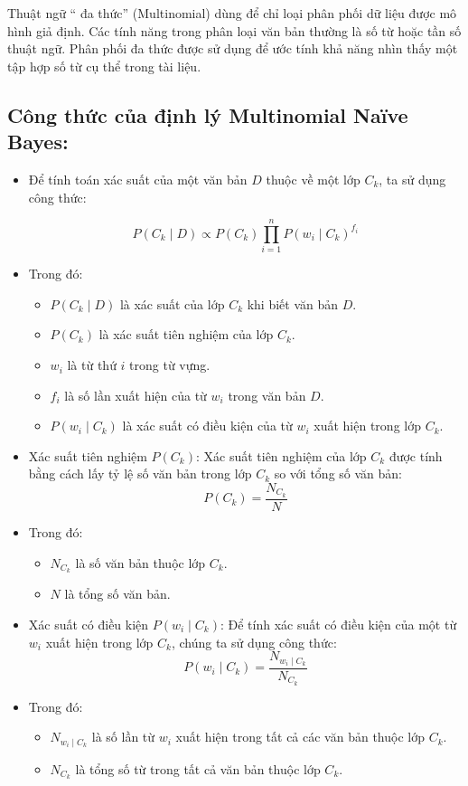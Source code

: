 Thuật ngữ “ đa thức” (Multinomial) dùng để chỉ loại phân phối dữ liệu được mô hình giả định. Các tính năng trong phân loại văn bản thường là số từ hoặc tần số thuật ngữ. Phân phối đa thức được sử dụng để ước tính khả năng nhìn thấy một tập hợp số từ cụ thể trong tài liệu.
\clearpage
\subsection{Công thức của định lý Multinomial Naïve Bayes:}

\begin{itemize}
    \item Để tính toán xác suất của một văn bản \( D \) thuộc về một lớp \( C_k \), ta sử dụng công thức:

\[
P(C_k \mid D) \propto P(C_k) \prod_{i=1}^{n} P(w_i \mid C_k)^{f_i}
\]
    \item Trong đó:
\begin{itemize}
    \item \( P(C_k \mid D) \) là xác suất của lớp \( C_k \) khi biết văn bản \( D \).
    \item \( P(C_k) \) là xác suất tiên nghiệm của lớp \( C_k \).
    \item \( w_i \) là từ thứ \( i \) trong từ vựng.
    \item \( f_i \) là số lần xuất hiện của từ \( w_i \) trong văn bản \( D \).
    \item \( P(w_i \mid C_k) \) là xác suất có điều kiện của từ \( w_i \) xuất hiện trong lớp \( C_k \).
\end{itemize}

    \item Xác suất tiên nghiệm \( P(C_k) \): Xác suất tiên nghiệm của lớp \( C_k \) được tính bằng cách lấy tỷ lệ số văn bản trong lớp \( C_k \) so với tổng số văn bản:
\[
P(C_k) = \frac{N_{C_k}}{N}
\]
    \item Trong đó:
\begin{itemize}
    \item \( N_{C_k} \) là số văn bản thuộc lớp \( C_k \).
    \item \( N \) là tổng số văn bản.
\end{itemize}

    \item Xác suất có điều kiện \( P(w_i \mid C_k) \): Để tính xác suất có điều kiện của một từ \( w_i \) xuất hiện trong lớp \( C_k \), chúng ta sử dụng công thức:
\[
P(w_i \mid C_k) = \frac{N_{w_i \mid C_k}}{N_{C_k}}
\]

    \item Trong đó:
\begin{itemize}
    \item \( N_{w_i \mid C_k} \) là số lần từ \( w_i \) xuất hiện trong tất cả các văn bản thuộc lớp \( C_k \).
    \item \( N_{C_k} \) là tổng số từ trong tất cả văn bản thuộc lớp \( C_k \).
\end{itemize}

\end{itemize}
\clearpage
